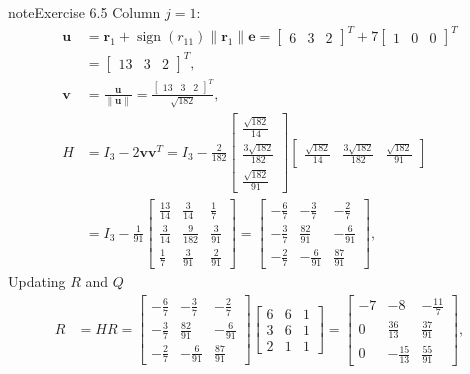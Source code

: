 \documentclass[letterpaper,10pt,english]{jupyterBook}
\begin{document}
\begin{sphinxadmonition}{note}{Exercise 6.5}
\sphinxAtStartPar
Column \(j = 1\):
\begin{align*}
    \mathbf{u} &= \mathbf{r}_{1} + \operatorname{sign}(r_{11}) \| \mathbf{r}_{1} \| \mathbf{e} = \left[\begin{matrix}6 & 3 & 2\end{matrix}\right]^T + 7 \left[\begin{matrix}1 & 0 & 0\end{matrix}\right]^T \\
    &= \left[\begin{matrix}13 & 3 & 2\end{matrix}\right]^T, \\
    \mathbf{v} &= \frac{\mathbf{u}}{\| \mathbf{u} \|} = \frac{\left[\begin{matrix}13 & 3 & 2\end{matrix}\right]^T}{\sqrt{182}}, \\
    H &= I_3 - 2\mathbf{vv}^T = I_3 - \frac{2}{182}\left[\begin{matrix}\frac{\sqrt{182}}{14}\\\frac{3 \sqrt{182}}{182}\\\frac{\sqrt{182}}{91}\end{matrix}\right]\left[\begin{matrix}\frac{\sqrt{182}}{14} & \frac{3 \sqrt{182}}{182} & \frac{\sqrt{182}}{91}\end{matrix}\right] \\
      &= I_3 - \frac{1}{91}\left[\begin{matrix}\frac{13}{14} & \frac{3}{14} & \frac{1}{7}\\\frac{3}{14} & \frac{9}{182} & \frac{3}{91}\\\frac{1}{7} & \frac{3}{91} & \frac{2}{91}\end{matrix}\right] = \left[\begin{matrix}- \frac{6}{7} & - \frac{3}{7} & - \frac{2}{7}\\- \frac{3}{7} & \frac{82}{91} & - \frac{6}{91}\\- \frac{2}{7} & - \frac{6}{91} & \frac{87}{91}\end{matrix}\right],
\end{align*}
\sphinxAtStartPar
Updating \(R\) and \(Q\)
\begin{align*}
    R &= H R = \left[\begin{matrix}- \frac{6}{7} & - \frac{3}{7} & - \frac{2}{7}\\- \frac{3}{7} & \frac{82}{91} & - \frac{6}{91}\\- \frac{2}{7} & - \frac{6}{91} & \frac{87}{91}\end{matrix}\right]\left[\begin{matrix}6 & 6 & 1\\3 & 6 & 1\\2 & 1 & 1\end{matrix}\right] = \left[\begin{matrix}-7 & -8 & - \frac{11}{7}\\0 & \frac{36}{13} & \frac{37}{91}\\0 & - \frac{15}{13} & \frac{55}{91}\end{matrix}\right], \\

\end{align*}
\end{sphinxadmonition}
\end{document}
